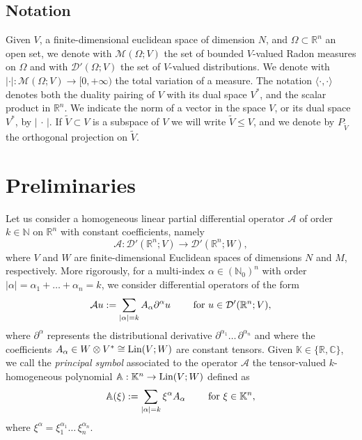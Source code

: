 \documentclass[11pt,reqno]{amsart}
\theoremstyle{plain}
\theoremstyle{definition}
\theoremstyle{remark}
\numberwithin{equation}{section}
\newcommand{\R}{\mathbb{R}}
\newcommand{\C}{\mathbb{C}}
\newcommand{\K}{\mathbb{K}}
\newcommand{\N}{\mathbb{N}}
\newcommand{\M}{\mathcal{M}}
\newcommand{\A}{\mathcal{A}}
\newcommand{\D}{\mathcal{D}}
\renewcommand{\AA}{\mathbb{A}}
\newcommand{\1}{\mathbbm{1}} %
\newcommand{\Lin}{\textnormal{Lin}}
\begin{document}

\subsection{Notation}
\label{sec:notation}

\setlength{\parindent}{0pt} 

Given $V$, a finite-dimensional euclidean space of dimension $N$, and $\Omega \subset \R^n$ an open set, we denote with $\M(\Omega;V)$ the set of bounded $V$-valued Radon measures on $\Omega$ and with $\D'(\Omega; V)$ the set of $V$-valued distributions. We denote with $| \cdot | : \M(\Omega;V) \to [0,+\infty)$ the total variation of a measure. The notation $\langle \cdot , \cdot \rangle$ denotes both the duality pairing of $V$ with its dual space $V^*$, and the scalar product in $\mathbb{R}^n$. We indicate the norm of a vector in the space $V$, or its dual space $V^*$, by $| \, \cdot  \, |$. If $\tilde V \subset V$ is a subspace of $V$ we will write $\tilde V \leq V$, and we denote by $P_{\tilde V}$ the orthogonal projection on $\tilde V$. 


\section{Preliminaries}
\label{sec:prel}

Let us consider a homogeneous linear partial differential operator $\A$ of order $k \in \N$ on $\R^n$ with constant coefficients, namely
\begin{equation*}
    \A : \D'(\R^n; V) \to \D'(\R^n; W),
\end{equation*}
where $V$ and $W$ are finite-dimensional Euclidean spaces of dimensions $N$ and $M$, respectively. More rigorously, for a multi-index $\alpha \in (\N_0)^n$ with order $|\alpha| = \alpha_1 + \ldots + \alpha_n = k$, we consider differential operators of the form
\begin{equation}
\label{def:operator}
    \A u := \sum_{|\alpha| = k} A_\alpha \partial^\alpha u \qquad \textnormal{ for } u \in \D'(\R^n; V),
\end{equation}
where $\partial^\alpha$ represents the distributional derivative $\partial^{\alpha_1} \ldots \, \partial^{\alpha_n}$ and where the coefficients $A_\alpha \in W \otimes V^* \cong \Lin(V;W)$ are constant tensors. Given $\K \in \{\R, \C\}$, we call the {\it principal symbol} associated to the operator $\A$ the tensor-valued $k$-homogeneous polynomial $\AA : \K^n \to \Lin(V;W)$ defined as
\begin{equation*}
    \AA(\xi) := \sum_{|\alpha| = k} \xi^\alpha A_\alpha \qquad \textnormal{ for } \xi \in \K^n,
\end{equation*}
where $\xi^\alpha = \xi_1^{\alpha_1} \ldots \, \xi_n^{\alpha_n}$.
\end{document}
